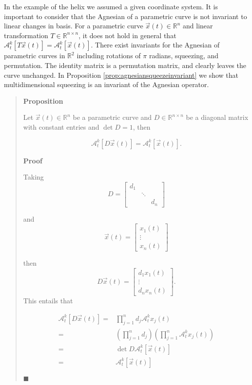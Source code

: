 \documentclass[
  letterpaper,
  DIV=11,
  numbers=noendperiod]{scrreprt}
\begin{document}
In the example of the helix we assumed a given coordinate system. It is
important to consider that the Agnesian of a parametric curve is not
invariant to linear changes in basis. For a parametric curve
\(\vec{x}(t) \in \mathbb{R}^n\) and linear transformation
\(T \in \mathbb{R}^{n \times n}\), it does not hold in general that
\(\mathcal{A}_t^k \left[ T \vec{x}(t) \right] = \mathcal{A}_t^k \left[ \vec{x}(t) \right]\).
There exist invariants for the Agnesian of parametric curves in
\(\mathbb{R}^{2}\) including rotations of \(\pi\) radians, squeezing,
and permutation. The identity matrix is a permutation matrix, and
clearly leaves the curve unchanged. In Proposition
\ref{prop:agnesiansqueezeinvariant} we show that multidimensional
squeezing is an invariant of the Agnesian operator.

\begin{quote}
\textbf{Proposition}

Let \(\vec{x}(t) \in \mathbb{R}^n\) be a parametric curve and
\(D \in \mathbb{R}^{n \times n}\) be a diagonal matrix with constant
entries and \(\det D = 1\), then

\[\mathcal{A}_t^k \left[ D \vec{x}(t) \right] = \mathcal{A}_t^k \left[ \vec{x}(t) \right].\]

\textbf{Proof}

Taking \[
 D =
 \begin{bmatrix}
   d_{1} & & \\
   & \ddots & \\
   & & d_{n}
 \end{bmatrix}\]

and \[\vec{x}(t) = \begin{bmatrix}
x_1(t) \\
\vdots \\
x_n(t)
\end{bmatrix}\]

then \[D \vec{x}(t) = \begin{bmatrix}
d_1 x_1(t) \\
\vdots \\
d_n x_n(t)
\end{bmatrix}.\] This entails that

\begin{align*}
\mathcal{A}_t^k \left[ D \vec{x}(t) \right] =& \prod_{j=1}^n d_j \mathcal{A}_t^k x_j(t) \\
=& \left( \prod_{j=1}^n d_j \right) \left( \prod_{j=1}^n \mathcal{A}_t^k x_j(t) \right) \\
=& \det D \mathcal{A}_t^k \left[ \vec{x}(t) \right] \\
=& \mathcal{A}_t^k \left[ \vec{x}(t) \right]
\end{align*}

\(\blacksquare\)
\end{quote}
\end{document}
